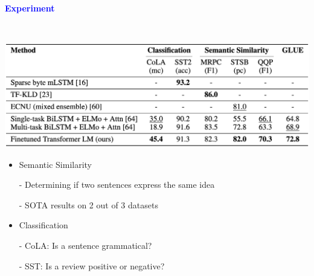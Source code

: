 \documentclass[professionalfont]{beamer}
\begin{document}
\begin{frame}
\begin{center}
    { \textbf{\textcolor{blue}{ {\fontsize{12}{14}\selectfont Experiment} }} }
\end{center}
\\[0.3cm]
\begin{center}
    \includegraphics[width=1.0\textwidth]{table/4.png}
\end{center}

{\fontsize{10}{14}\selectfont 
\begin{itemize}
    \item Semantic Similarity

    - Determining if two sentences express the same idea

    - SOTA results on 2 out of 3 datasets
    
    \item Classification

    - CoLA: Is a sentence grammatical?

    - SST: Is a review positive or negative?
\end{itemize}
}

\end{frame}
\end{document}
